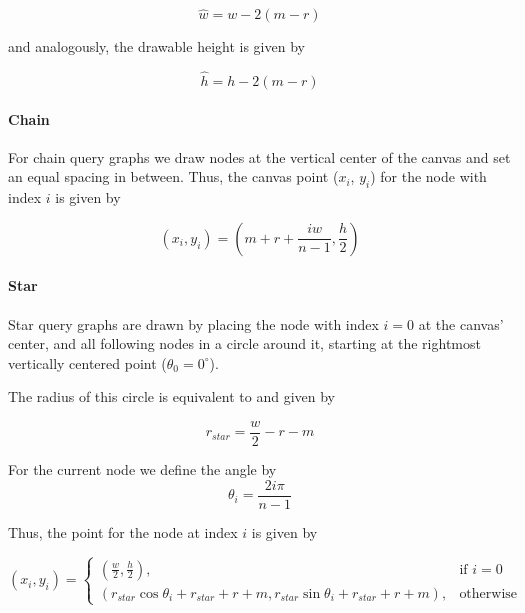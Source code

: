 \begin{equation}\label{eqn:painting-w_hat}
    \hat{w} = w - 2(m - r)
\end{equation}

and analogously, the drawable height is given by

\begin{equation}\label{eqn:painting-h_hat}
    \hat{h} = h - 2(m - r)    
\end{equation}

\paragraph{Chain} For chain query graphs we draw nodes at the vertical center of the canvas and set an equal spacing in between. Thus, the canvas point ($x_i$, $y_i$) for the node with index $i$ is given by


\begin{equation}
    (x_i, y_i) = (m + r + \frac{i\hat{w}}{n - 1}, \frac{h}{2})
\end{equation}

\paragraph{Star} 
Star query graphs are drawn by placing the node with index $i = 0$ at the canvas' center, and all following nodes in a circle around it, starting at the rightmost vertically centered point ($\theta_0 = 0^{\circ}$).

The radius of this circle is equivalent to %
and given by 

\begin{equation}\label{eqn:painting-r_star}
    r_{star} = \frac{w}{2} - r - m
\end{equation}

For the current node we define the angle by
\begin{equation}\label{eqn:painting-theta}
    \theta_i = \frac{2i\pi}{n - 1}
\end{equation}

Thus, the point for the node at index $i$ is given by

\begin{equation}
    (x_i, y_i) = 
    \begin{cases}
        (\frac{w}{2}, \frac{h}{2}),& \text{if } i = 0\\
        (r_{star}\cos{\theta_i} + r_{star} + r + m, r_{star}\sin{\theta_i} + r_{star} + r + m), & \text{otherwise}
    \end{cases}
\end{equation}

